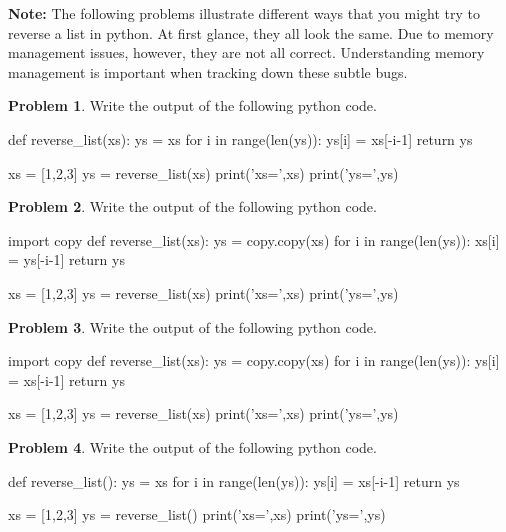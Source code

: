 \documentclass[12pt]{article}
\theoremstyle{definition}
\newtheorem{problem}{Problem}
\begin{document}
\newpage
\noindent
\textbf{Note:}
The following problems illustrate different ways that you might try to reverse a list in python.
At first glance, they all look the same.
Due to memory management issues, however, they are not all correct.
Understanding memory management is important when tracking down these subtle bugs.

\begin{problem}
Write the output of the following python code.
\begin{python}
def reverse_list(xs):
    ys = xs
    for i in range(len(ys)):
        ys[i] = xs[-i-1]
    return ys

xs = [1,2,3]
ys = reverse_list(xs)
print('xs=',xs)
print('ys=',ys)
\end{python}
\end{problem}
\vspace{2in}

\begin{problem}
Write the output of the following python code.
\begin{python}
import copy
def reverse_list(xs):
    ys = copy.copy(xs)
    for i in range(len(ys)):
        xs[i] = ys[-i-1]
    return ys

xs = [1,2,3]
ys = reverse_list(xs)
print('xs=',xs)
print('ys=',ys)
\end{python}
\end{problem}
\vspace{1.5in}

\newpage
\begin{problem}
Write the output of the following python code.
\begin{python}
import copy
def reverse_list(xs):
    ys = copy.copy(xs)
    for i in range(len(ys)):
        ys[i] = xs[-i-1]
    return ys

xs = [1,2,3]
ys = reverse_list(xs)
print('xs=',xs)
print('ys=',ys)
\end{python}
\end{problem}
\vspace{1in}

\begin{problem}
Write the output of the following python code.
\begin{python}
def reverse_list():
    ys = xs
    for i in range(len(ys)):
        ys[i] = xs[-i-1]
    return ys

xs = [1,2,3]
ys = reverse_list()
print('xs=',xs)
print('ys=',ys)
\end{python}
\end{problem}
\end{document}
